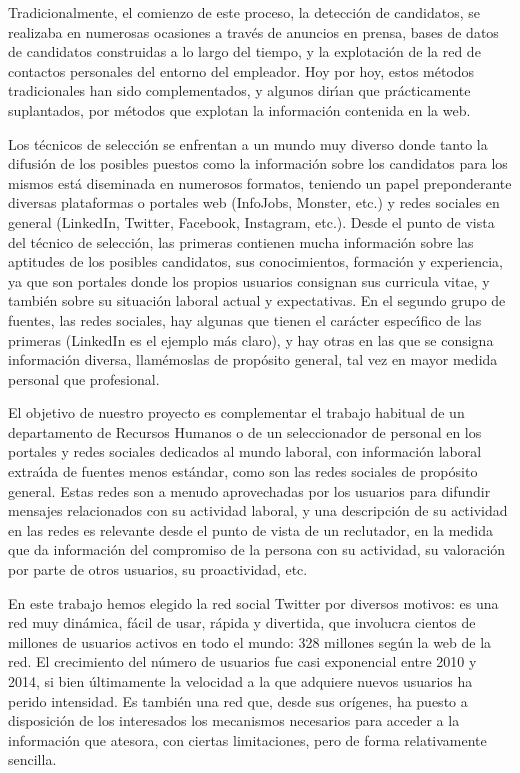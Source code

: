 Tradicionalmente, el comienzo de este proceso, la detecci\'on de candidatos, se realizaba en numerosas ocasiones 
a trav\'es de anuncios en prensa,
bases de datos de candidatos construidas a lo largo del tiempo, y la explotaci\'on de la red de contactos personales del entorno 
del empleador. Hoy por hoy, estos m\'etodos tradicionales han sido complementados, y algunos dir\'\i an que pr\'acticamente
suplantados, por m\'etodos que explotan la informaci\'on contenida en la web. 

Los t\'ecnicos de selecci\'on se enfrentan a un mundo muy diverso donde tanto la difusi\'on de los 
posibles puestos como la informaci\'on sobre los candidatos para los mismos est\'a diseminada en numerosos
formatos, teniendo un papel preponderante diversas plataformas o portales web (InfoJobs, Monster, etc.)
y redes sociales en general (LinkedIn, Twitter, Facebook, Instagram, etc.). Desde el punto de vista del t\'ecnico de selecci\'on, las
primeras contienen mucha informaci\'on sobre las aptitudes de los posibles candidatos, sus conocimientos, formaci\'on y 
experiencia, ya que son portales donde los propios usuarios consignan sus curricula vitae, y tambi\'en sobre su situaci\'on laboral
actual y expectativas. En el segundo grupo de fuentes, las redes sociales, hay algunas que tienen el car\'acter espec\'\i fico 
de las primeras (LinkedIn es el ejemplo m\'as claro), y hay otras en las que se consigna informaci\'on diversa, llam\'emoslas de 
prop\'osito general, tal vez en mayor medida personal que profesional.

El objetivo de nuestro proyecto es complementar el 
trabajo habitual de un departamento de Recursos Humanos o de un seleccionador de personal en
los portales y redes sociales dedicados al mundo laboral, con informaci\'on laboral extra\'\i da 
de fuentes menos est\'andar, como son las redes sociales de prop\'osito general. 
Estas redes son a menudo aprovechadas por los usuarios para difundir mensajes relacionados con su actividad
laboral, y una descripción de su actividad en las redes es relevante desde el punto de vista 
de un reclutador, en la medida que da informaci\'on del compromiso de la persona con su actividad, su valoración por
parte de otros usuarios, su proactividad, etc.

En este trabajo hemos elegido la red social Twitter por diversos motivos: es una red muy dinámica, fácil de usar, rápida y divertida,
que involucra cientos de millones de usuarios activos en todo el mundo: 328 millones según la web de la red. El crecimiento del número 
de usuarios fue casi exponencial entre 2010 y 2014, si bien últimamente la velocidad a la que adquiere nuevos usuarios ha perido intensidad.
Es también una red que, desde sus orígenes, ha puesto a disposición de los interesados los mecanismos necesarios para acceder a 
la información que atesora, con ciertas limitaciones, pero de forma relativamente sencilla. 



